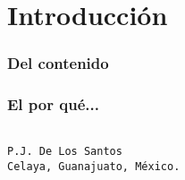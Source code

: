 \chapter*{Introducción}

\subsection*{Del contenido}



\subsection*{El por qué...}


\begin{verbatim}

P.J. De Los Santos
Celaya, Guanajuato, México.
\end{verbatim}

